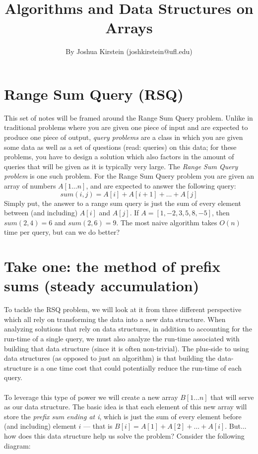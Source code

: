 \documentclass[11pt]{article}
\theoremstyle{plain}
\theoremstyle{definition}
\begin{document}
 


\title{Algorithms and Data Structures on Arrays}
\author{By Joshua Kirstein (joshkirstein@ufl.edu)}
\maketitle

\section{Range Sum Query (RSQ)}
This set of notes will be framed around the Range Sum Query problem. Unlike in traditional problems where you are given one piece of input and are expected to produce one piece of output, \emph{query problems} are a class in which you are given some data as well as a set of questions (read: queries) on this data; for these problems, you have to design a solution which also factors in the amount of queries that will be given as it is typically very large. The \emph{Range Sum Query problem} is one such problem. For the Range Sum Query problem you are given an array of numbers $A[1 \dots n]$, and are expected to answer the following query:
$$\boxed{sum(i, j) = A[i] + A[i+1] + ... + A[j]}$$
Simply put, the answer to a range sum query is just the sum of every element between (and including) $A[i]$ and $A[j]$. If $A = [1, -2, 3, 5, 8, -5]$, then $sum(2, 4) = 6$ and $sum(2, 6) = 9$. The most naive algorithm takes $O(n)$ time per query, but can we do better?
\section{Take one: the method of prefix sums (steady accumulation)}
To tackle the RSQ problem, we will look at it from three different perspective which all rely on transforming the data into a new data structure. When analyzing solutions that rely on data structures, in addition to accounting for the run-time of a single query, we must also analyze the run-time associated with building that data structure (since it is often non-trivial). The plus-side to using data structures (as opposed to just an algorithm) is that building the data-structure is a one time cost that could potentially reduce the run-time of each query.\\\\
To leverage this type of power we will create a new array $B[1...n]$ that will serve as our data structure. The basic idea is that each element of this new array will store the \emph{prefix sum ending at i}, which is just the sum of every element before (and including) element $i$ --- that is $B[i] = A[1] + A[2] + \dots + A[i]$. But... how does this data structure help us solve the problem? Consider the following diagram:
\end{document}
